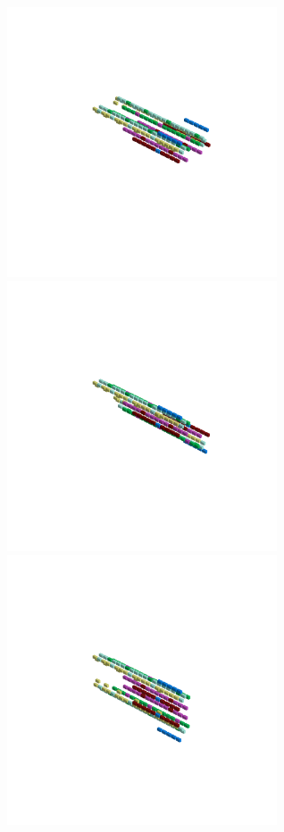 \begin{minipage}[b]{0.50\linewidth}                                       
  \begin{figure}[H]
      \centering
        \vspace*{-1cm}
        \hspace*{-2cm}
        \includegraphics[width=8cm]{src/symmetries/pattern3_1-45.png}%
        \hspace*{-4cm}
        \includegraphics[width=8cm]{src/symmetries/pattern3_2-45.png}\\
        \vspace*{-5cm}
        \hspace*{-1cm}
        \includegraphics[width=8cm]{src/symmetries/pattern3_3-45.png}\\

\end{figure}
\end{minipage}
